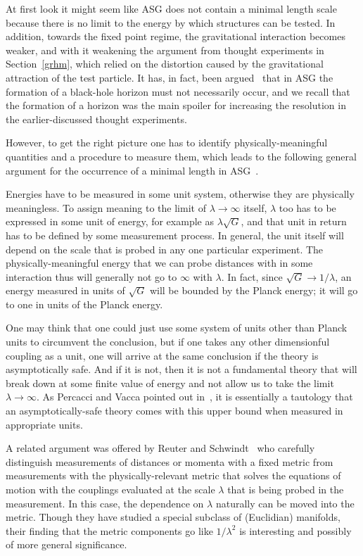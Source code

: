 \documentclass{article}
\begin{document}
At first look it might seem like
{\sc ASG} does not contain a minimal length scale because there is no limit to the energy
by which structures can be tested. In addition, towards the fixed point regime, 
the gravitational interaction becomes weaker, and with it weakening the argument from
thought experiments in Section~\ref{grhm}, which relied on the distortion caused by
the gravitational attraction of the test particle. It has, in fact, been argued~\cite{Basu:2010nf,Falls:2010he} that in ASG the formation of a black-hole horizon must not necessarily occur, and we
recall that the formation of a horizon was the main spoiler for increasing the
resolution in the earlier-discussed thought experiments.  

However, to get the right picture one has to identify physically-meaningful quantities and a procedure to measure them, which leads to the
following  general argument for
the occurrence of a minimal length in ASG~\cite{Calmet:2010tx,Percacci:2010af}. 

Energies have to be measured in some
unit system, otherwise they are physically meaningless. To assign meaning to
the limit of $\lambda \to \infty$ itself, $\lambda$ too has to be expressed in
some unit of energy, for example as $\lambda \sqrt{G}$, and that unit 
in return has to be defined by some measurement process. In general, the unit 
itself will depend on the scale that is probed in any one particular
experiment. The physically-meaningful energy that we can probe distances
with in some interaction thus will generally not go to $\infty$ with $\lambda$. 
In fact, since $\sqrt{G} \to 1/\lambda$, an energy measured in units of
$\sqrt{G}$ will be bounded by the Planck energy; it will go to one in units
of the Planck energy. 

One may think that one could just use some system of units other than Planck
units to circumvent the conclusion, but if one takes any other dimensionful coupling
as a unit, one will arrive at the same conclusion if the theory is asymptotically safe.
And if it is not, then it is not a fundamental theory that will break down at
some finite value of energy and not allow us to take the limit $\lambda \to \infty$.
As Percacci and Vacca pointed out in~\cite{Percacci:2010af}, it is essentially a tautology
that an asymptotically-safe theory comes with this upper bound when measured in
appropriate units.  

A related argument was offered by Reuter and Schwindt~\cite{Reuter:2005bb} who 
carefully distinguish measurements of distances or momenta with a fixed metric 
from measurements with the physically-relevant metric that solves the equations 
of motion with the  couplings evaluated at the scale $\lambda$ that is being 
probed in the measurement.
In this case, the dependence on $\lambda$ naturally can be moved into the metric. Though
they have studied a special subclass of (Euclidian) manifolds, their finding
that the metric components go like $1/\lambda^2$ is interesting and possibly of
more general significance. 
\end{document}
